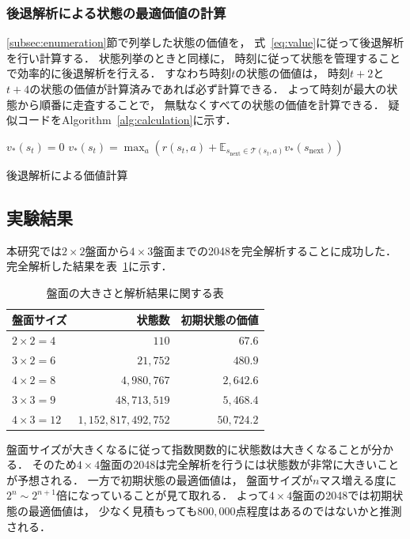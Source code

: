 \subsubsection{後退解析による状態の最適価値の計算}
\label{subsec:calculation}
\ref{subsec:enumeration}節で列挙した状態の価値を， 式~\ref{eq:value}に従って後退解析を行い計算する．
状態列挙のときと同様に， 時刻に従って状態を管理することで効率的に後退解析を行える．
すなわち時刻$t$の状態の価値は， 時刻$t+2$と$t+4$の状態の価値が計算済みであれば必ず計算できる．
よって時刻が最大の状態から順番に走査することで， 無駄なくすべての状態の価値を計算できる．
疑似コードをAlgorithm~\ref{alg:calculation}に示す．
\begin{algorithm}[tb]
    \begin{algorithmic}[1]
                    \State $v_*(s_t) = 0$
                \Else {}
                    \State $v_*(s_t) = \max_a \left(r(s_t,a) + \mathbb{E}_{s_\text{next} \in \mathcal{T}(s_t,a)} v_*(s_\text{next}) \right)$
                \EndIf
            \EndFor
        \EndFor
    \EndFunction
    \end{algorithmic}
    \caption{後退解析による価値計算}
    \label{alg:calculation}
\end{algorithm}

\subsection{実験結果}
本研究では$2\times2$盤面から$4\times3$盤面までの2048を完全解析することに成功した．
完全解析した結果を表~\ref{table: analysis_table}に示す．
\begin{table}[t]
    \centering
    \begin{tabular}{lrr}
        \hline \hline
        盤面サイズ & 状態数 & 初期状態の価値\\ \hline
        $2\times2=4$ & $110$ & $67.6$ \\
        $3\times2=6$ & $21,752$ & $480.9$ \\
        $4\times2=8$ & $4,980,767$ & $2,642.6$ \\
        $3\times3=9$ & $48,713,519$ & $5,468.4$ \\
        $4\times3=12$ & $1,152,817,492,752$ & $50,724.2$ \\
        \hline
    \end{tabular}
    \caption{盤面の大きさと解析結果に関する表}
    \label{table: analysis_table}
\end{table}
盤面サイズが大きくなるに従って指数関数的に状態数は大きくなることが分かる．
そのため$4\times4$盤面の2048は完全解析を行うには状態数が非常に大きいことが予想される．
一方で初期状態の最適価値は， 盤面サイズが$n$マス増える度に$2^n \sim 2^{n+1}$倍になっていることが見て取れる．
よって$4\times4$盤面の2048では初期状態の最適価値は， 少なく見積もっても$800,000$点程度はあるのではないかと推測される．

